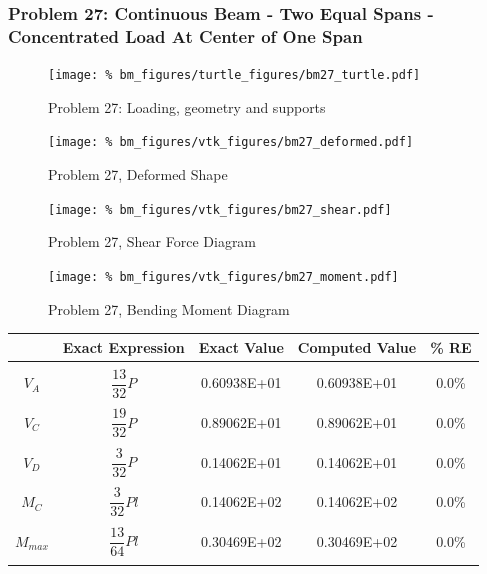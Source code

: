 \subsubsection{Problem 27: Continuous Beam - Two Equal Spans - Concentrated Load At Center of One Span}
\begin{figure}[h]
    \texttt{[image: \%
                            bm\_figures/turtle\_figures/bm27\_turtle.pdf]}
    \centering
    \caption{Problem 27: Loading, geometry and supports}
    \label{fig:bm27_turtle}
\end{figure}


\begin{figure}[!htb]
    \texttt{[image: \%
                     bm\_figures/vtk\_figures/bm27\_deformed.pdf]}
    \centering
    \caption{Problem 27, Deformed Shape}
    \label{fig:bm27_deformed}
\end{figure}
\begin{figure}[!htb]
    \texttt{[image: \%
                     bm\_figures/vtk\_figures/bm27\_shear.pdf]}
    \centering
    \caption{Problem 27, Shear Force Diagram}
    \label{fig:bm27_shear}
\end{figure}
\begin{figure}[!htb]
    \texttt{[image: \%
                     bm\_figures/vtk\_figures/bm27\_moment.pdf]}
    \centering
    \caption{Problem 27, Bending Moment Diagram}
    \label{fig:bm27_moment}
\end{figure}
\begin{table}[h!]
\centering
\begin{tabular}{ c| c c c c }
    & Exact Expression & Exact Value & Computed Value & \% RE \\ \hline \\
    $V_A$  & $\dfrac{13}{32}P$ & 0.60938E+01 & 0.60938E+01 & 0.0\% \\ \\
    $V_C$  & $\dfrac{19}{32}P$ & 0.89062E+01 & 0.89062E+01 & 0.0\% \\ \\
    $V_D$  & $\dfrac{3}{32}P$ & 0.14062E+01 & 0.14062E+01 & 0.0\% \\ \\
    $M_C$ & $\dfrac{3}{32}Pl$ & 0.14062E+02 & 0.14062E+02 & 0.0\% \\ \\
    $M_{max}$ & $\dfrac{13}{64}Pl$ & 0.30469E+02 & 0.30469E+02 & 0.0\% \\ \\
\end{tabular}
\end{table}

